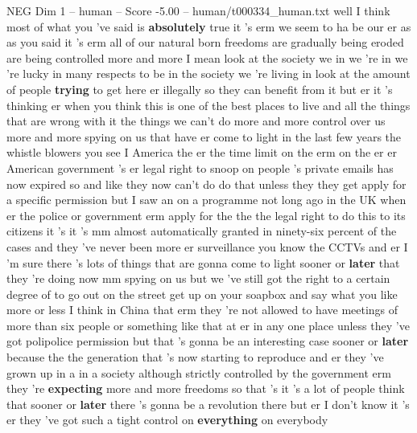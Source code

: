 \begin{textsample}{NEG Dim 1 – human – Score -5.00 – human/t000334\_human.txt}  \label{ex:f1_neg_039}
well I think most of what you 've said is \textbf{absolutely} true it 's erm we seem to ha be our er as as you said it 's erm all of our natural born freedoms are gradually being eroded are being controlled more and more I mean look at the society we in we 're in we 're lucky in many respects to be in the society we 're living in look at the amount of people \textbf{trying} to get here er illegally so they can benefit from it but er it 's thinking er when you think this is one of the best places to live and all the things that are wrong with it the things we can't do more and more control over us more and more spying on us that have er come to light in the last few years the whistle blowers you see I America the er the time limit on the erm on the er er American government 's er legal right to snoop on people 's private emails has now expired so and like they now can't do do that unless they they get apply for a specific permission but I saw an on a programme not long ago in the UK when er the police or government erm apply for the the the legal right to do this to its citizens it 's it 's mm almost automatically granted in ninety-six percent of the cases and they 've never been more er surveillance you know the CCTVs and er I 'm sure there 's lots of things that are gonna come to light sooner or \textbf{later} that they 're doing now mm spying on us but we 've still got the right to a certain degree of to go out on the street get up on your soapbox and say what you like more or less I think in China that erm they 're not allowed to have meetings of more than six people or something like that at er in any one place unless they 've got polipolice permission but that 's gonna be an interesting case sooner or \textbf{later} because the the generation that 's now starting to reproduce and er they 've grown up in a in a society although strictly controlled by the government erm they 're \textbf{expecting} more and more freedoms so that 's it 's a lot of people think that sooner or \textbf{later} there 's gonna be a revolution there but er I don't know it 's er they 've got such a tight control on \textbf{everything} on everybody

\end{textsample}
